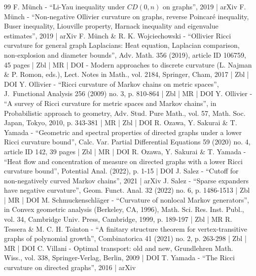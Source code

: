 \documentclass[10pt]{amsart}
\theoremstyle{definition}
\begin{document}
\begin{thebibliography}{99}
F. Münch - “Li-Yau inequality under $ CD (0, n) $ on graphs”, 2019 | arXiv
F. Münch - “Non-negative Ollivier curvature on graphs, reverse Poincaré inequality, Buser inequality, Liouville property, Harnack inequality and eigenvalue estimates”, 2019 | arXiv
F. Münch \& R. K. Wojciechowski - “Ollivier Ricci curvature for general graph Laplacians: Heat equation, Laplacian comparison, non-explosion and diameter bounds”, Adv. Math. 356 (2019), article ID 106759, 45 pages | Zbl | MR | DOI
- Modern approaches to discrete curvature (L. Najman \& P. Romon, eds.), Lect. Notes in Math., vol. 2184, Springer, Cham, 2017 | Zbl | DOI
Y. Ollivier - “Ricci curvature of Markov chains on metric spaces”, J. Functional Analysis 256 (2009) no. 3, p. 810-864 | Zbl | MR | DOI
Y. Ollivier - “A survey of Ricci curvature for metric spaces and Markov chains”, in Probabilistic approach to geometry, Adv. Stud. Pure Math., vol. 57, Math. Soc. Japan, Tokyo, 2010, p. 343-381 | MR | Zbl | DOI
R. Ozawa, Y. Sakurai \& T. Yamada - “Geometric and spectral properties of directed graphs under a lower Ricci curvature bound”, Calc. Var. Partial Differential Equations 59 (2020) no. 4, article ID 142, 39 pages | Zbl | MR | DOI
R. Ozawa, Y. Sakurai \& T. Yamada - “Heat flow and concentration of measure on directed graphs with a lower Ricci curvature bound”, Potential Anal. (2022), p. 1-15 | DOI
J. Salez - “Cutoff for non-negatively curved Markov chains”, 2021 | arXiv
J. Salez - “Sparse expanders have negative curvature”, Geom. Funct. Anal. 32 (2022) no. 6, p. 1486-1513 | Zbl | MR | DOI
M. Schmuckenschläger - “Curvature of nonlocal Markov generators”, in Convex geometric analysis (Berkeley, CA, 1996), Math. Sci. Res. Inst. Publ., vol. 34, Cambridge Univ. Press, Cambridge, 1999, p. 189-197 | Zbl | MR
R. Tessera \& M. C. H. Tointon - “A finitary structure theorem for vertex-transitive graphs of polynomial growth”, Combinatorica 41 (2021) no. 2, p. 263-298 | Zbl | MR | DOI
C. Villani - Optimal transport: old and new, Grundlehren Math. Wiss., vol. 338, Springer-Verlag, Berlin, 2009 | DOI
T. Yamada - “The Ricci curvature on directed graphs”, 2016 | arXiv
\end{thebibliography}
\end{document}
